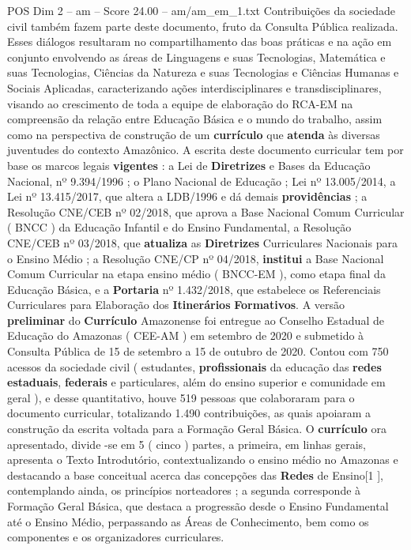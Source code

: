 \begin{textsample}{POS Dim 2 – am – Score 24.00 – am/am\_em\_1.txt}
Contribuições da sociedade civil também fazem parte deste documento, fruto da Consulta Pública realizada.
Esses diálogos resultaram no compartilhamento das boas práticas e na ação em conjunto envolvendo as áreas de Linguagens e suas Tecnologias, Matemática e suas Tecnologias, Ciências da Natureza e suas Tecnologias e Ciências Humanas e Sociais Aplicadas, caracterizando ações interdisciplinares e transdisciplinares, visando ao crescimento de toda a equipe de elaboração do RCA-EM na compreensão da relação entre Educação Básica e o mundo do trabalho, assim como na perspectiva de construção de um \textbf{currículo} que \textbf{atenda} às diversas juventudes do contexto Amazônico.
A escrita deste documento curricular tem por base os marcos legais \textbf{vigentes} : a Lei de \textbf{Diretrizes} e Bases da Educação Nacional, nº 9.394/1996 ; o Plano Nacional de Educação ; Lei nº 13.005/2014, a Lei nº 13.415/2017, que altera a LDB/1996 e dá demais \textbf{providências} ; a Resolução CNE/CEB nº 02/2018, que aprova a Base Nacional Comum Curricular ( BNCC ) da Educação Infantil e do Ensino Fundamental, a Resolução CNE/CEB nº 03/2018, que \textbf{atualiza} as \textbf{Diretrizes} Curriculares Nacionais para o Ensino Médio ; a Resolução CNE/CP nº 04/2018, \textbf{institui} a Base Nacional Comum Curricular na etapa ensino médio ( BNCC-EM ), como etapa final da Educação Básica, e a \textbf{Portaria} nº 1.432/2018, que estabelece os Referenciais Curriculares para Elaboração dos \textbf{Itinerários} \textbf{Formativos}.
A versão \textbf{preliminar} do \textbf{Currículo} Amazonense foi entregue ao Conselho Estadual de Educação do Amazonas ( CEE-AM ) em setembro de 2020 e submetido à Consulta Pública de 15 de setembro a 15 de outubro de 2020.
Contou com 750 acessos da sociedade civil ( estudantes, \textbf{profissionais} da educação das \textbf{redes} \textbf{estaduais}, \textbf{federais} e particulares, além do ensino superior e comunidade em geral ), e desse quantitativo, houve 519 pessoas que colaboraram para o documento curricular, totalizando 1.490 contribuições, as quais apoiaram a construção da escrita voltada para a Formação Geral Básica.
O \textbf{currículo} ora apresentado, divide -se em 5 ( cinco ) partes, a primeira, em linhas gerais, apresenta o Texto Introdutório, contextualizando o ensino médio no Amazonas e destacando a base conceitual acerca das concepções das \textbf{Redes} de Ensino[1 ], contemplando ainda, os princípios norteadores ; a segunda corresponde à Formação Geral Básica, que destaca a progressão desde o Ensino Fundamental até o Ensino Médio, perpassando as Áreas de Conhecimento, bem como os componentes e os organizadores curriculares.

\end{textsample}

